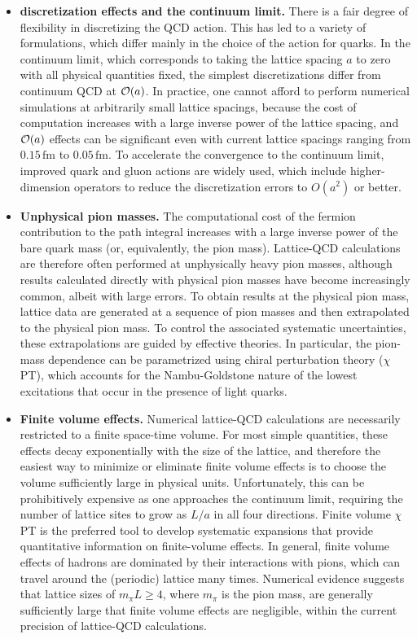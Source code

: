 \begin{itemize}

\item {\bfseries discretization effects and the continuum limit.} There is 
a fair degree of flexibility in discretizing the QCD action. This has
led to a variety of formulations, which differ mainly in the choice of
the action for quarks.
%
In the continuum limit, which corresponds to taking
the lattice spacing $a$ to zero with all physical quantities fixed,
the simplest discretizations differ from continuum QCD at ${\cal
O}(a)$.
%
In practice, one cannot afford to perform numerical
simulations at arbitrarily small lattice spacings, because the cost of
computation increases with a large inverse power of the lattice
spacing, and ${\cal O}(a)$ effects can be significant even
with current lattice spacings ranging from $0.15 \,\mbox{fm}$ to
$0.05 \,\mbox{fm}$.
%
To accelerate the convergence to the continuum
limit, improved quark and gluon actions are widely used, which include
higher-dimension operators to reduce the discretization errors to
$O(a^2)$ or better.

\item {\bfseries Unphysical pion masses.} 
The computational cost of the fermion contribution to the path
integral increases with a large inverse power of the bare quark mass
(or, equivalently, the pion mass).
%
Lattice-QCD calculations are therefore
often performed at unphysically heavy pion masses, although results calculated
directly with physical pion masses have become increasingly common, albeit with large
errors.
%
To obtain results at the physical pion mass, lattice data are
generated at a sequence of pion masses and then extrapolated to the
physical pion mass.
%
To control the associated systematic
uncertainties, these extrapolations are guided by effective
theories.
%
In particular, the pion-mass dependence can be parametrized
using chiral perturbation theory ($\chi$PT), which accounts for the
Nambu-Goldstone nature of the lowest excitations that occur in the
presence of light quarks. 

\item {\bfseries Finite volume effects.} Numerical lattice-QCD 
calculations are necessarily restricted to a finite space-time
volume.
%
For most simple quantities, these effects decay exponentially
with the size of the lattice, and therefore the easiest way to
minimize or eliminate finite volume effects is to choose the volume
sufficiently large in physical units.
%
Unfortunately, this can be
prohibitively expensive as one approaches the continuum limit, requiring the
number of lattice sites to grow as $L/a$ in all four directions. Finite volume $\chi$PT is the preferred
tool to develop systematic expansions that provide quantitative
information on finite-volume effects.
%
In general, finite volume
effects of hadrons are dominated by their interactions with pions,
which can travel around the (periodic) lattice many times.
%
Numerical
evidence suggests that lattice sizes of $m_\pi L \geq 4$, where
$m_\pi$ is the pion mass, are generally sufficiently large that finite
volume effects are negligible, within the current precision of lattice-QCD
calculations.


\end{itemize}
